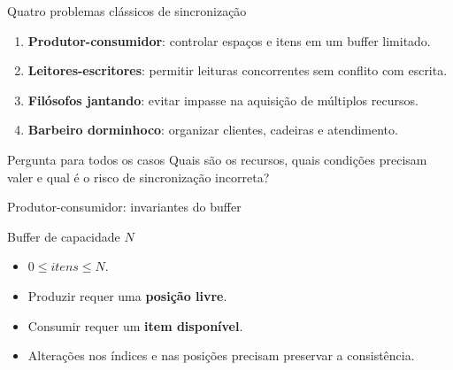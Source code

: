 \documentclass[aspectratio=169,11pt]{beamer}
\begin{document}
\begin{frame}{Quatro problemas clássicos de sincronização}
\begin{enumerate}
\setlength\itemsep{0.22cm}
\item \textbf{Produtor-consumidor}: controlar espaços e itens em um buffer limitado.
\item \textbf{Leitores-escritores}: permitir leituras concorrentes sem conflito com escrita.
\item \textbf{Filósofos jantando}: evitar impasse na aquisição de múltiplos recursos.
\item \textbf{Barbeiro dorminhoco}: organizar clientes, cadeiras e atendimento.
\end{enumerate}
\vspace{0.2cm}
\begin{alertblock}{Pergunta para todos os casos}
Quais são os recursos, quais condições precisam valer e qual é o risco de sincronização incorreta?
\end{alertblock}
\end{frame}

\begin{frame}{Produtor-consumidor: invariantes do buffer}
\begin{block}{Buffer de capacidade $N$}
\begin{itemize}
\item $0\leq itens\leq N$.
\item Produzir requer uma \textbf{posição livre}.
\item Consumir requer um \textbf{item disponível}.
\item Alterações nos índices e nas posições precisam preservar a consistência.
\end{itemize}
\end{block}
\vspace{0.25cm}
\begin{center}
\end{center}
\end{frame}
\end{document}
